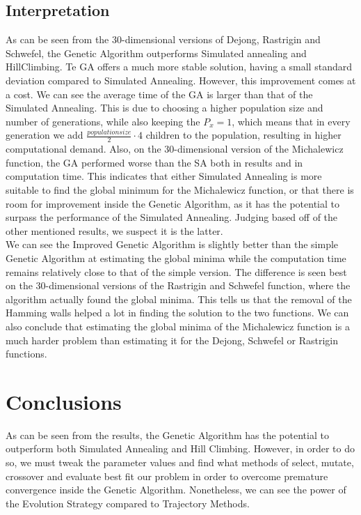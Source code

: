 \documentclass{article}
\begin{document}
\subsection{Interpretation}
As can be seen from the 30-dimensional versions of Dejong, Rastrigin and Schwefel, the Genetic Algorithm outperforms Simulated annealing and HillClimbing. Te GA offers a much more stable solution, having a small standard deviation compared to Simulated Annealing. However, this improvement comes at a cost. We can see the average time of the GA is larger than that of the Simulated Annealing. This is due to choosing a higher population size and number of generations, while also keeping the $P_x = 1$, which means that in every generation we add $\frac{population size}{2} \cdot 4$ children to the population, resulting in higher computational demand. Also, on the 30-dimensional version of the Michalewicz function, the GA performed worse than the SA both in results and in computation time. This indicates that either Simulated Annealing is more suitable to find the global minimum for the Michalewicz function, or that there is room for improvement inside the Genetic Algorithm, as it has the potential to surpass the performance of the Simulated Annealing. Judging based off of the other mentioned results, we suspect it is the latter.\\
We can see the Improved Genetic Algorithm is slightly better than the simple Genetic Algorithm at estimating the global minima while the computation time remains relatively close to that of the simple version. The difference is seen best on the 30-dimensional versions of the Rastrigin and Schwefel function, where the algorithm actually found the global minima. This tells us that the removal of the Hamming walls helped a lot in finding the solution to the two functions. We can also conclude that estimating the global minima of the Michalewicz function is a much harder problem than estimating it for the Dejong, Schwefel or Rastrigin functions.

\section{Conclusions}
As can be seen from the results, the Genetic Algorithm has the potential to outperform both Simulated Annealing and Hill Climbing. However, in order to do so, we must tweak the parameter values and find what methods of select, mutate, crossover and evaluate best fit our problem in order to overcome premature convergence inside the Genetic Algorithm. Nonetheless, we can see the power of the Evolution Strategy compared to Trajectory Methods.
\end{document}
